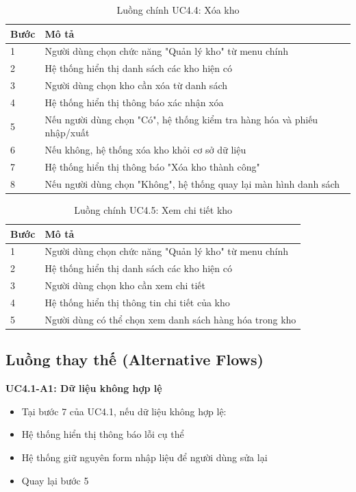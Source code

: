 \documentclass[a4paper,12pt]{article}
\begin{document}
\begin{table}[h]
\centering
\renewcommand{\arraystretch}{0.85}
\begin{tabular}{|p{1.5cm}|p{10cm}|}
\hline
\textbf{Bước} & \textbf{Mô tả} \\
\hline
1 & Người dùng chọn chức năng "Quản lý kho" từ menu chính \\
\hline
2 & Hệ thống hiển thị danh sách các kho hiện có \\
\hline
3 & Người dùng chọn kho cần xóa từ danh sách \\
\hline
4 & Hệ thống hiển thị thông báo xác nhận xóa \\
\hline
5 & Nếu người dùng chọn "Có", hệ thống kiểm tra hàng hóa và phiếu nhập/xuất \\
\hline
6 & Nếu không, hệ thống xóa kho khỏi cơ sở dữ liệu \\
\hline
7 & Hệ thống hiển thị thông báo "Xóa kho thành công" \\
\hline
8 & Nếu người dùng chọn "Không", hệ thống quay lại màn hình danh sách \\
\hline
\end{tabular}
\caption{Luồng chính UC4.4: Xóa kho}
\end{table}

\begin{table}[h]
\centering
\renewcommand{\arraystretch}{0.85}
\begin{tabular}{|p{1.5cm}|p{10cm}|}
\hline
\textbf{Bước} & \textbf{Mô tả} \\
\hline
1 & Người dùng chọn chức năng "Quản lý kho" từ menu chính \\
\hline
2 & Hệ thống hiển thị danh sách các kho hiện có \\
\hline
3 & Người dùng chọn kho cần xem chi tiết \\
\hline
4 & Hệ thống hiển thị thông tin chi tiết của kho \\
\hline
5 & Người dùng có thể chọn xem danh sách hàng hóa trong kho \\
\hline
\end{tabular}
\caption{Luồng chính UC4.5: Xem chi tiết kho}
\end{table}

\subsection{Luồng thay thế (Alternative Flows)}

\textbf{UC4.1-A1: Dữ liệu không hợp lệ}
\begin{itemize}
    \item Tại bước 7 của UC4.1, nếu dữ liệu không hợp lệ:
    \item Hệ thống hiển thị thông báo lỗi cụ thể
    \item Hệ thống giữ nguyên form nhập liệu để người dùng sửa lại
    \item Quay lại bước 5
\end{itemize}
\end{document}
